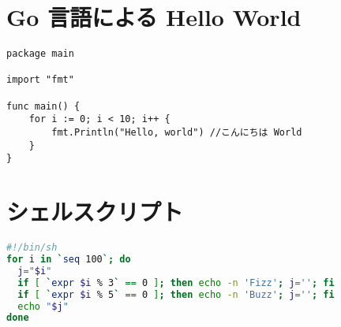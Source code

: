 \documentclass{ltjsarticle}
\begin{document}
\section{Go 言語による Hello World}

\begin{lstlisting}[language=Golang]
package main

import "fmt"

func main() {
	for i := 0; i < 10; i++ {
		fmt.Println("Hello, world") //こんにちは World
	}
}
\end{lstlisting}

\section{シェルスクリプト}

\begin{lstlisting}[language=sh]
#!/bin/sh
for i in `seq 100`; do
  j="$i"
  if [ `expr $i % 3` == 0 ]; then echo -n 'Fizz'; j=''; fi
  if [ `expr $i % 5` == 0 ]; then echo -n 'Buzz'; j=''; fi
  echo "$j"
done
\end{lstlisting}
\end{document}
